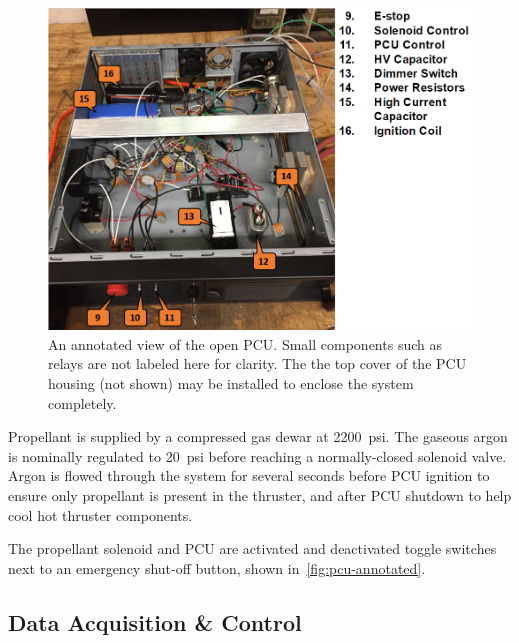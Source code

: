 \documentclass[conference]{IEEEtran}
\begin{document}
\begin{figure}[htp]
  \includegraphics[width=\linewidth]{figs/pcu-annotated.PNG}
  \caption{An annotated view of the open PCU.\@
  Small components such as relays are not labeled here for clarity.
  The the top cover of the PCU housing (not shown) may be installed to enclose the system completely.
\label{fig:pcu-annotated}
}
\end{figure}

Propellant is supplied by a compressed gas dewar at \SI{2200}{psi}.
The gaseous argon is nominally regulated to \SI{20}{psi} before reaching a normally-closed solenoid valve.
Argon is flowed through the system for several seconds before PCU ignition to ensure only propellant is present in the thruster, and after PCU shutdown to help cool hot thruster components.

The propellant solenoid and PCU are activated and deactivated toggle switches next to an emergency shut-off button, shown in~\autoref{fig:pcu-annotated}.

\subsection{Data Acquisition \& Control}
\end{document}
